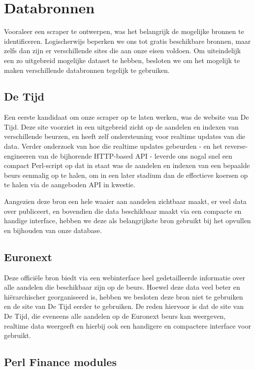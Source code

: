 \section{Databronnen}

Vooraleer een scraper te ontwerpen, was het belangrijk de mogelijke bronnen te identificeren. Logischerwijs beperken we ons tot gratis beschikbare bronnen, maar zelfs dan zijn er verschillende sites die aan onze eisen voldoen. Om uiteindelijk een zo uitgebreid mogelijke dataset te hebben, besloten we om het mogelijk te maken verschillende databronnen tegelijk te gebruiken.

\subsection{De Tijd}

Een eerste kandidaat om onze scraper op te laten werken, was de website van De Tijd. Deze site voorziet in een uitgebreid zicht op de aandelen en indexen van verschillende beurzen, en heeft zelf ondersteuning voor realtime updates van die data. Verder onderzoek van hoe die realtime updates gebeurden - en het reverse-engineeren van de bijhorende HTTP-based API - leverde ons nogal snel een compact Perl-script op dat in staat was de aandelen en indexen van een bepaalde beurs eenmalig op te halen, om in een later stadium dan de effectieve koersen op te halen via de aangeboden API in kwestie.

Aangezien deze bron een hele waaier aan aandelen zichtbaar maakt, er veel data over publiceert, en bovendien die data beschikbaar maakt via een compacte en handige interface, hebben we deze als belangrijkste bron gebruikt bij het opvullen en bijhouden van onze database.

\subsection{Euronext}

Deze offici\"ele bron biedt via een webinterface heel gedetailleerde informatie over alle aandelen die beschikbaar zijn op de beurs. Hoewel deze data veel beter en hi\"erarchischer georganiseerd is, hebben we besloten deze bron niet te gebruiken en de site van De Tijd eerder te gebruiken. De reden hiervoor is dat de site van De Tijd, die eveneens alle aandelen op de Euronext beurs kan weergeven, realtime data weergeeft en hierbij ook een handigere en compactere interface voor gebruikt.

\subsection{Perl Finance modules}

